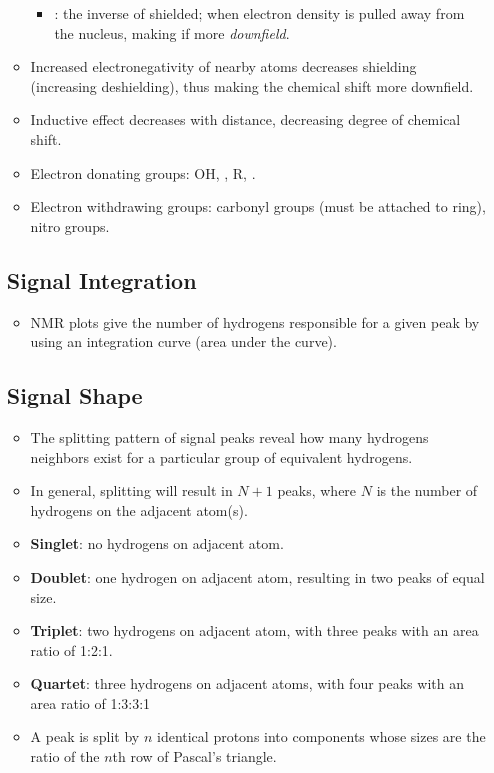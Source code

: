 \begin{itemize}
\begin{itemize}
\begin{itemize}
            \item {}: the inverse of shielded; when electron density is pulled away from the nucleus, making if more \emph{downfield}. 
          \end{itemize}
        \item Increased electronegativity of nearby atoms decreases shielding (increasing deshielding), thus making the chemical shift more downfield.
        \item Inductive effect decreases with distance, decreasing degree of chemical shift.
        \item Electron donating groups: OH, , R, .
        \item Electron withdrawing groups: carbonyl groups (must be attached to ring), nitro groups.
    \end{itemize}
    
    \subsection{Signal Integration}\label{Signal Integration}
    \begin{itemize}
        \item NMR plots give the number of hydrogens responsible for a given peak by using an integration curve (area under the curve). 
    \end{itemize}

    \subsection{Signal Shape}\label{Signal Shape}
    \begin{itemize}
        \item The splitting pattern of signal peaks reveal how many hydrogens neighbors exist for a particular group of equivalent hydrogens.
        \item In general, splitting will result in \(N + 1\) peaks, where \(N\) is the number of hydrogens on the adjacent atom(s).
        \item \textbf{Singlet}: no hydrogens on adjacent atom.
        \item \textbf{Doublet}: one hydrogen on adjacent atom, resulting in two peaks of equal size.
        \item \textbf{Triplet}: two hydrogens on adjacent atom, with three peaks with an area ratio of 1:2:1.
        \item \textbf{Quartet}: three hydrogens on adjacent atoms, with four peaks with an area ratio of 1:3:3:1
        \item A peak is split by \(n\) identical protons into components whose sizes are the ratio of the \(n\)th row of Pascal's triangle.
    \end{itemize}  
\end{itemize}